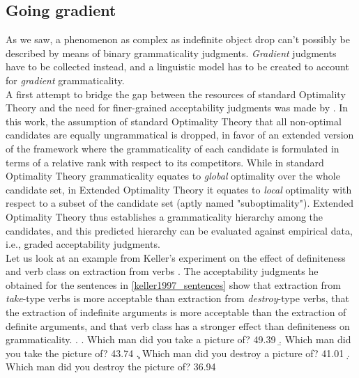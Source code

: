 \subsection{Going gradient}  %
As we saw, a phenomenon as complex as indefinite object drop can't possibly be described by means of binary grammaticality judgments. \textit{Gradient} judgments have to be collected instead, and a linguistic model has to be created to account for \textit{gradient} grammaticality.\\
A first attempt to bridge the gap between the resources of standard Optimality Theory and the need for finer-grained acceptability judgments was made by \textcite{keller1997extraction}. In this work, the assumption of standard Optimality Theory that all non-optimal candidates are equally ungrammatical is dropped, in favor of an extended version of the framework where the grammaticality of each candidate is formulated in terms of a relative rank with respect to its competitors. While in standard Optimality Theory grammaticality equates to \textit{global} optimality over the whole candidate set, in Extended Optimality Theory it equates to \textit{local} optimality with respect to a subset of the candidate set (aptly named "suboptimality"). Extended Optimality Theory thus establishes a grammaticality hierarchy among the candidates, and this predicted hierarchy can be evaluated against empirical data, i.e., graded acceptability judgments.\\
Let us look at an example from Keller's experiment on the effect of definiteness and verb class on extraction from verbs \parencite[10-12]{keller1997extraction}. The acceptability judgments he obtained for the sentences in \ref{keller1997_sentences} show that extraction from \textit{take}-type verbs is more acceptable than extraction from \textit{destroy}-type verbs, that the extraction of indefinite arguments is more acceptable than the extraction of definite arguments, and that verb class has a stronger effect than definiteness on grammaticality.
\ex. \label{keller1997_sentences} \a. Which man did you take a picture of? \hfill 49.39
\b. Which man did you take the picture of? \hfill 43.74
\c. Which man did you destroy a picture of? \hfill 41.01
\d. Which man did you destroy the picture of? \hfill 36.94

